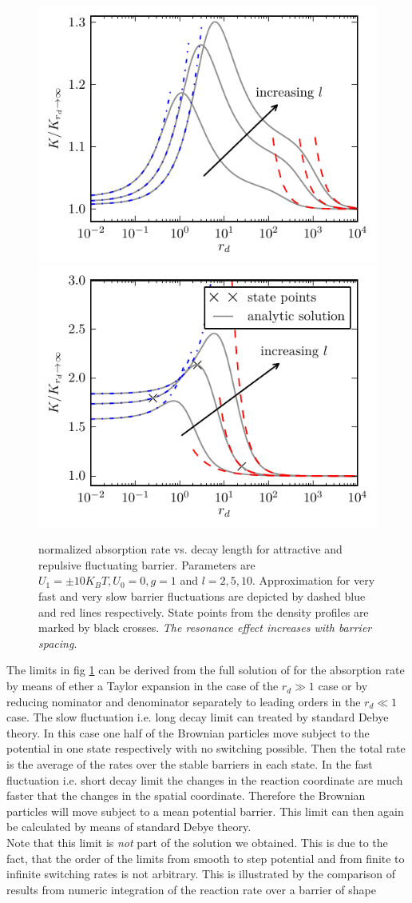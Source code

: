 \documentclass[twocolumn,superscriptaddress]{revtex4}
\begin{document}
\begin{figure}[H]
\includegraphics[width= .5 \textwidth]{plots/ab_rates.pdf}
\includegraphics[width= .5 \textwidth]{plots/rb_rates.pdf}
\caption{normalized absorption rate vs. decay length for attractive and repulsive fluctuating barrier. \newline Parameters are $U_1 = \pm 10 K_B T, U_0= 0, g = 1$ and $l=2,5,10$. Approximation for very fast and very slow barrier fluctuations are depicted by dashed blue and red lines respectively. State points from the density profiles are marked by black crosses. \emph{The resonance effect increases with barrier spacing}.}
\label{fig3}
\end{figure}
The limits in fig \ref{fig3} can be derived from the full solution of for the absorption rate by means of ether a Taylor expansion in the case of the $r_d \gg 1$ case or by reducing nominator and denominator separately to leading orders in the $r_d \ll 1$ case. The slow fluctuation i.e. long decay limit can treated by standard Debye theory. In this case one half of the Brownian particles move subject to the potential in one state respectively with no switching possible. Then the total rate is the average of the rates over the stable barriers in each state. In the fast fluctuation i.e. short decay limit the changes in the reaction coordinate are much faster that the changes in the spatial coordinate. Therefore the Brownian particles will move subject to a mean potential barrier. This limit can then again be calculated by means of standard Debye theory.\\ Note that this limit is \emph{not} part of the solution we obtained. This is due to the fact, that the order of the limits from smooth to step potential and from finite to infinite switching rates is not arbitrary. This is illustrated by the comparison of results from numeric integration of the reaction rate over a barrier of shape
\end{document}
